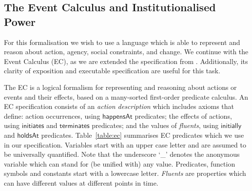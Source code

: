 
\subsection{The Event Calculus and Institutionalised Power}

For this formalisation we wish to use a language which is able to represent and reason about action, agency, social constraints, and change. 
We continue with the Event Calculus (EC), as we are extended the specification from . Additionally, its clarity of exposition and executable specification are useful for this task.

The EC is a logical formalism for representing and reasoning about actions or events and their effects, based on a many-sorted first-order predicate calculus. 
An EC specification consists of an \emph{action description} which includes axioms that define: action occurrences, using $\mathsf{happensAt}$ predicates; the effects of actions, using $\mathsf{initiates}$ and $\mathsf{terminates}$ predicates; and the values of \emph{fluents}, using $\mathsf{initially}$ and $\mathsf{holdsAt}$ predicates. 
Table~\ref{table:ec} summarises EC predicates which we use in our specification. 
Variables start with an upper case letter and are assumed to be universally quantified. Note that the underscore `\_' denotes
the anonymous variable which can stand for (be unified with) any value. 
Predicates, function symbols and constants start with a lowercase letter. 
\emph{Fluents} are properties which can have different values at different points in time.

